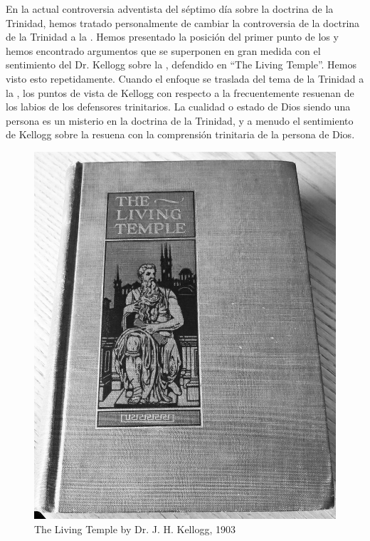 En la actual controversia adventista del séptimo día sobre la doctrina de la Trinidad, hemos tratado personalmente de cambiar la controversia de la doctrina de la Trinidad a la . Hemos presentado la posición del primer punto de los  y hemos encontrado argumentos que se superponen en gran medida con el sentimiento del Dr. Kellogg sobre la , defendido en “The Living Temple”. Hemos visto esto repetidamente. Cuando el enfoque se traslada del tema de la Trinidad a la , los puntos de vista de Kellogg con respecto a la  frecuentemente resuenan de los labios de los defensores trinitarios. La cualidad o estado de Dios siendo una persona es un misterio en la doctrina de la Trinidad, y a menudo el sentimiento de Kellogg sobre la  resuena con la comprensión trinitaria de la persona de Dios.


\begin{figure}[hp]
    \centering
    \includegraphics[width=1\linewidth]{images/TLT.jpg}
    \caption*{The Living Temple by Dr. J. H. Kellogg, 1903}
    \label{fig:tlt}
\end{figure}


